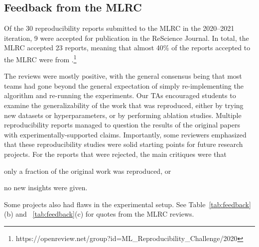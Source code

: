 \subsection{Feedback from the MLRC}
\label{section:feedback-mlrc}

Of the 30 reproducibility reports submitted to the MLRC in the 2020--2021 iteration, 9 were accepted for publication in the ReScience Journal.  
In total, the MLRC accepted 23 reports, meaning that almost 40\% of the reports accepted to the MLRC were from \OurUniversity{}.\footnote{https://openreview.net/group?id=ML\_Reproducibility\_Challenge/2020}
 
The reviews were mostly positive, with the general consensus being that most teams had gone beyond the general expectation of simply re-implementing the algorithm and re-running the experiments. 
Our TAs encouraged students to examine the generalizability of the work that was reproduced, either by trying new datasets or hyperparameters, or by performing ablation studies. 
Multiple reproducibility reports managed to question the results of the original papers with experimentally-supported claims. 
Importantly, some reviewers emphasized that these reproducibility studies were solid starting points for future research projects. 
For the reports that were rejected, the main critiques were that
\begin{enumerate*}[label=(\roman*)]
    \item only a fraction of the original work was reproduced, or 
    \item no new insights were given.
\end{enumerate*}
Some projects also had flaws in the experimental setup. 
See Table~\ref{tab:feedback}(b) and  ~\ref{tab:feedback}(c) for quotes from the MLRC reviews.  

